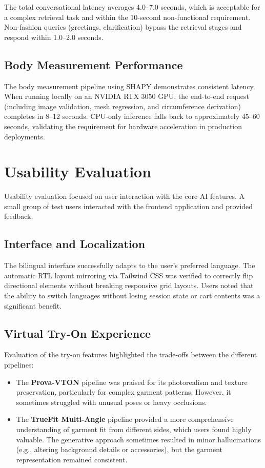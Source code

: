 The total conversational latency averages 4.0--7.0 seconds, which is acceptable for a complex retrieval task and within the 10-second non-functional requirement. Non-fashion queries (greetings, clarification) bypass the retrieval stages and respond within 1.0--2.0 seconds.

\subsection{Body Measurement Performance}

The body measurement pipeline using SHAPY demonstrates consistent latency. When running locally on an NVIDIA RTX 3050 GPU, the end-to-end request (including image validation, mesh regression, and circumference derivation) completes in 8--12 seconds. CPU-only inference falls back to approximately 45--60 seconds, validating the requirement for hardware acceleration in production deployments.

\section{Usability Evaluation}
\label{sec:test-usability}

Usability evaluation focused on user interaction with the core AI features. A small group of test users interacted with the frontend application and provided feedback.

\subsection{Interface and Localization}

The bilingual interface successfully adapts to the user's preferred language. The automatic RTL layout mirroring via Tailwind CSS was verified to correctly flip directional elements without breaking responsive grid layouts. Users noted that the ability to switch languages without losing session state or cart contents was a significant benefit.

\subsection{Virtual Try-On Experience}

Evaluation of the try-on features highlighted the trade-offs between the different pipelines:
\begin{itemize}[leftmargin=*]
    \item The \textbf{Prova-VTON} pipeline was praised for its photorealism and texture preservation, particularly for complex garment patterns. However, it sometimes struggled with unusual poses or heavy occlusions.
    \item The \textbf{TrueFit Multi-Angle} pipeline provided a more comprehensive understanding of garment fit from different sides, which users found highly valuable. The generative approach sometimes resulted in minor hallucinations (e.g., altering background details or accessories), but the garment representation remained consistent.
\end{itemize}

